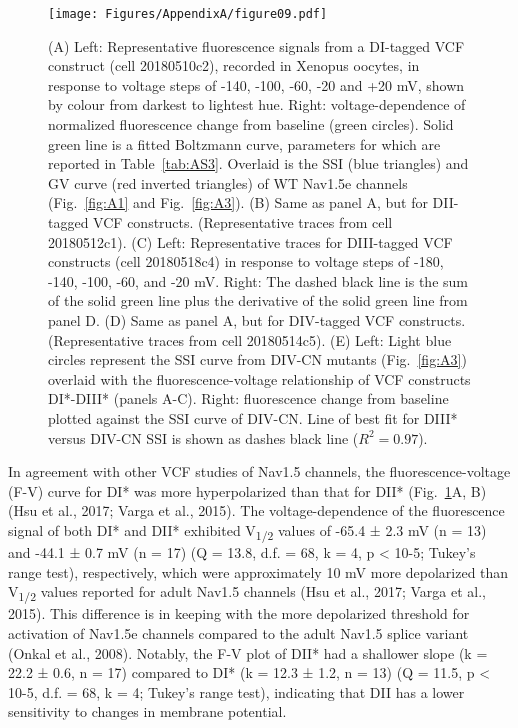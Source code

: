 \begin{figure}[t]
\begin{minipage}[c]{85mm}
    \centering
    \texttt{[image: Figures/AppendixA/figure09.pdf]}
\end{minipage}\hfill
\begin{minipage}[c]{70mm}
    \caption{
    (A) Left: Representative fluorescence signals from a DI-tagged VCF construct (cell 20180510c2), recorded in Xenopus oocytes, in response to voltage steps of -140, -100, -60, -20 and +20 mV, shown by colour from darkest to lightest hue. Right: voltage-dependence of normalized fluorescence change from baseline (green circles). Solid green line is a fitted Boltzmann curve, parameters for which are reported in Table~\ref{tab:AS3}. Overlaid is the SSI (blue triangles) and GV curve (red inverted triangles) of WT Nav1.5e channels (Fig.~\ref{fig:A1} and Fig.~\ref{fig:A3}).  
    (B) Same as panel A, but for DII-tagged VCF constructs. (Representative traces from cell 20180512c1).  
    (C) Left: Representative traces for DIII-tagged VCF constructs (cell 20180518c4) in response to voltage steps of -180, -140, -100, -60, and -20 mV. Right: The dashed black line is the sum of the solid green line plus the derivative of the solid green line from panel D. 
    (D) Same as panel A, but for DIV-tagged VCF constructs. (Representative traces from cell 20180514c5). 
    (E) Left: Light blue circles represent the SSI curve from DIV-CN mutants (Fig.~\ref{fig:A3}) overlaid with the fluorescence-voltage relationship of VCF constructs DI*-DIII* (panels A-C). Right: fluorescence change from baseline plotted against the SSI curve of DIV-CN. Line of best fit for DIII* versus DIV-CN SSI is shown as dashes black line ($R^2 = 0.97$).
    \label{fig:A9}
}
\end{minipage}
\end{figure}

In agreement with other VCF studies of Nav1.5 channels, the fluorescence-voltage (F-V) curve for DI* was more hyperpolarized than that for DII* (Fig.~\ref{fig:A9}A, B) (Hsu et al., 2017; Varga et al., 2015). The voltage-dependence of the fluorescence signal of both DI* and DII* exhibited V\textsubscript{1/2} values of -65.4 ± 2.3 mV (n = 13) and -44.1 ± 0.7 mV (n = 17) (Q = 13.8, d.f. = 68, k = 4, p < 10-5; Tukey’s range test), respectively, which were approximately 10 mV more depolarized than V\textsubscript{1/2} values reported for adult Nav1.5 channels (Hsu et al., 2017; Varga et al., 2015). This difference is in keeping with the more depolarized threshold for activation of Nav1.5e channels compared to the adult Nav1.5 splice variant (Onkal et al., 2008). Notably, the F-V plot of DII* had a shallower slope (k = 22.2 ± 0.6, n = 17) compared to DI* (k = 12.3 ± 1.2, n = 13) (Q = 11.5, p < 10-5, d.f. = 68, k = 4; Tukey’s range test), indicating that DII has a lower sensitivity to changes in membrane potential.

